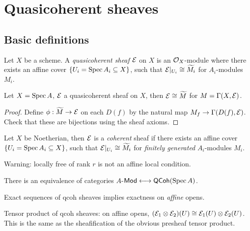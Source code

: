 \documentclass[11pt]{amsart}
\begin{document}
\section{Quasicoherent sheaves}

\subsection{Basic definitions}

\begin{defn}
    Let $X$ be a scheme. A \emph{quasicoherent sheaf} $\mathcal{E}$ on $X$ is an $\mathcal{O}_X$-module where there exists an affine cover $\{U_i = \operatorname{Spec} A_i \subseteq X\}$, such that $\mathcal{E}|_{U_i} \cong \widetilde{M_i}$ for $A_i$-modules $M_i$.
\end{defn}

\begin{prop}
    Let $X = \operatorname{Spec} A$, $\mathcal{E}$ a quasicoherent sheaf on $X$, then $\mathcal{E}\cong \widetilde{M}$ for $M = \Gamma(X, \mathcal{E})$.
\end{prop}

\begin{proof}
    Define $\phi:\widetilde{M}\to \mathcal{E}$ on each $D(f)$ by the natural map $M_f\to \Gamma(D(f), \mathcal{E})$. Check that these are bijections using the sheaf axioms.
\end{proof}

\begin{defn}
    Let $X$ be Noetherian, then $\mathcal{E}$ is a \emph{coherent} sheaf if there exists an affine cover $\{U_i = \operatorname{Spec} A_i \subseteq X\}$, such that $\mathcal{E}|_{U_i} \cong \widetilde{M_i}$ for \emph{finitely generated} $A_i$-modules $M_i$.
\end{defn}

Warning: locally free of rank $r$ is not an affine local condition.

\begin{prop}
    There is an equivalence of categories $A$-$\mathsf{Mod} \longleftrightarrow \mathsf{QCoh}(\operatorname{Spec} A)$.
\end{prop}

\begin{cor}
    Exact sequences of qcoh sheaves implies exactness on \emph{affine} opens.
\end{cor}

\begin{exm}
    Tensor product of qcoh sheaves: on affine opens, $(\mathcal{E}_1\otimes \mathcal{E}_2)(U) \cong \mathcal{E}_1(U)\otimes \mathcal{E}_2(U)$. This is the same as the sheafification of the obvious presheaf tensor product.
\end{exm}
\end{document}
